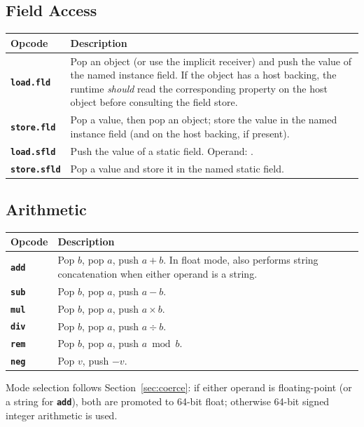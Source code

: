 \documentclass[11pt,a4paper]{article}
\newcommand{\code}[1]{\texttt{\small #1}}
\newcommand{\opcode}[1]{\textbf{\texttt{#1}}}
\begin{document}
\subsection{Field Access}

\begin{longtable}{lp{10.5cm}}
  \toprule
  \textbf{Opcode} & \textbf{Description} \\
  \midrule
  \endhead
  \opcode{load.fld}  &
    Pop an object (or use the implicit receiver) and push the value of the
    named instance field. If the object has a host backing, the runtime
    \textit{should} read the corresponding property on the host object
    before consulting the field store. \\
  \opcode{store.fld}  &
    Pop a value, then pop an object; store the value in the named instance
    field (and on the host backing, if present). \\
  \opcode{load.sfld} &
    Push the value of a static field.
    Operand: \code{<Field name>}. \\
  \opcode{store.sfld} & Pop a value and store it in the named static field. \\
  \bottomrule
\end{longtable}

\subsection{Arithmetic}

\begin{longtable}{lp{10.5cm}}
  \toprule
  \textbf{Opcode} & \textbf{Description} \\
  \midrule
  \endhead
  \opcode{add} &
    Pop $b$, pop $a$, push $a + b$.
    In float mode, also performs string concatenation when either operand
    is a string. \\
  \opcode{sub} & Pop $b$, pop $a$, push $a - b$. \\
  \opcode{mul} & Pop $b$, pop $a$, push $a \times b$. \\
  \opcode{div} & Pop $b$, pop $a$, push $a \div b$. \\
  \opcode{rem} & Pop $b$, pop $a$, push $a \bmod b$. \\
  \opcode{neg} & Pop $v$, push $-v$. \\
  \bottomrule
\end{longtable}

Mode selection follows Section~\ref{sec:coerce}: if either operand is
floating-point (or a string for \opcode{add}), both are promoted to 64-bit
float; otherwise 64-bit signed integer arithmetic is used.
\end{document}
